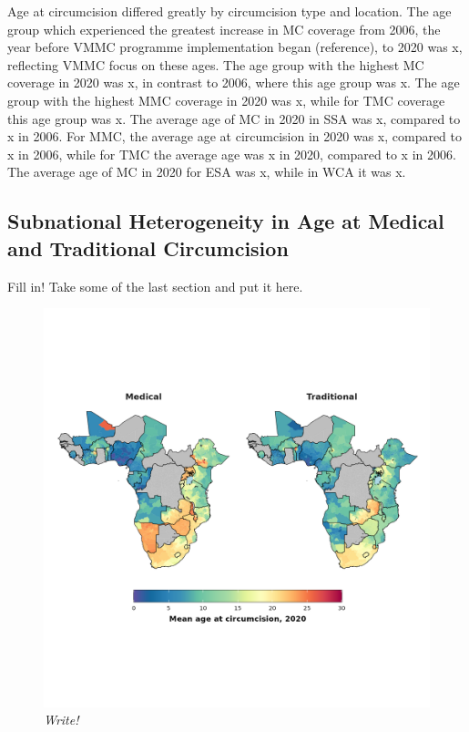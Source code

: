 \documentclass{article}
\begin{document}
Age at circumcision differed greatly by circumcision type and location. 
The age group which experienced the greatest increase in MC coverage from 2006, the year before VMMC programme implementation began (reference), to 2020 was x, reflecting VMMC focus on these ages. 
The age group with the highest MC coverage in 2020 was x, in contrast to 2006, where this age group was x. 
The age group with the highest MMC coverage in 2020 was x, while for TMC coverage this age group was x. 
The average age of MC in 2020 in SSA was x, compared to x in 2006. 
For MMC, the average age at circumcision in 2020 was x, compared to x in 2006, while for TMC the average age was x in 2020, compared to x in 2006. 
The average age of MC in 2020 for ESA was x, while in WCA it was x. 

\subsection{Subnational Heterogeneity in Age at Medical and Traditional Circumcision}
\label{sec:org92e0f37}

Fill in! Take some of the last section and put it here. 

\begin{figure}[H]
    \centering
    \includegraphics[width=.9\linewidth]
    {plots/05_map_plot_mean_circ_age.png}
    \caption{\emph{Write!}}
\end{figure}
\end{document}
